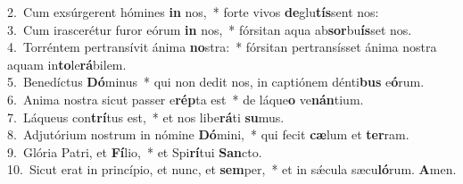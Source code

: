 {2.~}Cum exsúrgerent hómines \textbf{in} nos,~* forte vivos \textbf{de}glu\textbf{tís}sent nos:\\
{3.~}Cum irascerétur furor eórum \textbf{in} nos,~* fórsitan aqua ab\textbf{sor}bu\textbf{ís}set nos.\\
{4.~}Torréntem pertransívit ánima \textbf{no}stra:~* fórsitan pertransísset ánima nostra aquam in\textbf{to}le\textbf{rá}bilem.\\
{5.~}Benedíctus \textbf{Dó}minus~* qui non dedit nos, in captiónem dénti\textbf{bus} e\textbf{ó}rum.\\
{6.~}Anima nostra sicut passer e\textbf{rép}ta est~* de láque\textbf{o} ve\textbf{nán}tium.\\
{7.~}Láqueus con\textbf{trí}tus est,~* et nos libe\textbf{rá}ti \textbf{su}mus.\\
{8.~}Adjutórium nostrum in nómine \textbf{Dó}mini,~* qui fecit \textbf{cæ}lum et \textbf{ter}ram.\\
{9.~}Glória Patri, et \textbf{Fí}lio,~* et Spi\textbf{rí}tui \textbf{San}cto.\\
{10.~}Sicut erat in princípio, et nunc, et \textbf{sem}per,~* et in sǽcula sæcu\textbf{ló}rum. \textbf{A}men.\\
